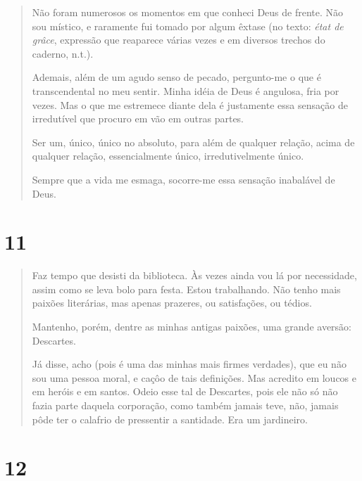\begin{quote}
Não foram numerosos os momentos em que conheci Deus de frente. Não sou
místico, e raramente fui tomado por algum êxtase (no texto: \emph{état
de grâce}, expressão que reaparece várias vezes e em diversos trechos do
caderno, n.t.).

Ademais, além de um agudo senso de pecado, pergunto-me o que é
transcendental no meu sentir. Minha idéia de Deus é angulosa, fria por
vezes. Mas o que me estremece diante dela é justamente essa sensação de
irredutível que procuro em vão em outras partes.

Ser um, único, único no absoluto, para além de qualquer relação, acima
de qualquer relação, essencialmente único, irredutivelmente único.

Sempre que a vida me esmaga, socorre-me essa sensação inabalável de
Deus.
\end{quote}

\section{11}\label{section-10}

\begin{quote}
Faz tempo que desisti da biblioteca. Às vezes ainda vou lá por
necessidade, assim como se leva bolo para festa. Estou trabalhando. Não
tenho mais paixões literárias, mas apenas prazeres, ou satisfações, ou
tédios.

Mantenho, porém, dentre as minhas antigas paixões, uma grande aversão:
Descartes.

Já disse, acho (pois é uma das minhas mais firmes verdades), que eu não
sou uma pessoa moral, e caçôo de tais definições. Mas acredito em loucos
e em heróis e em santos. Odeio esse tal de Descartes, pois ele não só
não fazia parte daquela corporação, como também jamais teve, não, jamais
pôde ter o calafrio de pressentir a santidade. Era um jardineiro.
\end{quote}

\section{12}\label{section-11}

